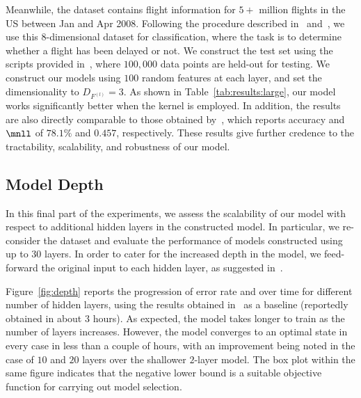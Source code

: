 Meanwhile, the \airline dataset contains flight information for $5+$ million flights in the US between Jan and Apr 2008.
Following the procedure described in~\citet{Hensman13} and~\citet{Wilson16}, we use this $8$-dimensional dataset for classification, where the task is to determine whether a flight has been delayed or not.
We construct the test set using the scripts provided in~\citet{Wilson16}, where $100,000$ data points are held-out for testing.
We construct our \dgp models using $100$ random features at each layer, and set the dimensionality to $D_{F^{(l)}} = 3$. 
As shown in Table~\ref{tab:results:large}, our model works significantly better when the \rbf kernel is employed. 
In addition, the results are also directly comparable to those obtained by~\citet{Wilson16}, which reports accuracy and $\mnll$ of $78.1\%$ and $0.457$, respectively. 
These results give further credence to the tractability, scalability, and robustness of our model.

\subsection{Model Depth}
%
In this final part of the experiments, we assess the scalability of our model with respect to additional hidden layers in the constructed model.
In particular, we re-consider the \airline dataset and evaluate the performance of \dgprbf models constructed using up to $30$ layers. 
In order to cater for the increased depth in the model, we feed-forward the original input to each hidden layer, as suggested in~\citet{Duvenaud14}.



Figure~\ref{fig:depth} reports the progression of error rate and \mnll over time for different number of hidden layers, using the results obtained in~\citet{Wilson16} as a baseline (reportedly obtained in about $3$ hours).
As expected, the model takes longer to train as the number of layers increases.
However, the model converges to an optimal state in every case in less than a couple of hours, with an improvement being noted in the case of $10$ and $20$ layers over the shallower $2$-layer model.
The box plot within the same figure indicates that the negative lower bound is a suitable objective function for carrying out model selection.


